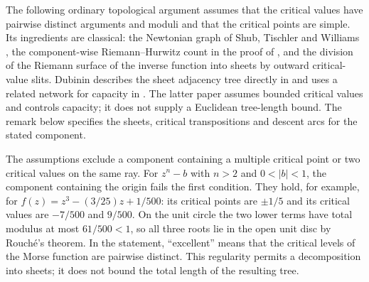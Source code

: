 \documentclass[11pt]{article}
\begin{document}
The following ordinary topological argument assumes that the critical
values have pairwise distinct arguments and moduli and that the critical
points are simple. Its ingredients are classical: the Newtonian graph of Shub, Tischler and Williams
\cite[\S2]{kozen-stefansson1997}, the component-wise Riemann--Hurwitz count in
the proof of \cite[Proposition~2.1]{eks2010}, and the division of the Riemann
surface of the inverse function into sheets by outward critical-value
slits.  Dubinin describes the sheet adjacency tree directly in
\cite[\S1, pp.~1169--1170]{dubinin2006critical} and uses a related
network for capacity in \cite[\S2, pp.~34--35]{dubinin2006capacity}.
The latter paper assumes bounded critical values and controls capacity;
it does not supply a Euclidean tree-length bound. The remark below
specifies the sheets, critical transpositions and descent arcs for the
stated component.

The assumptions exclude a component containing a multiple critical point
or two critical values on the same ray. For $z^n-b$ with $n>2$ and
$0<|b|<1$, the component containing the origin fails the first condition.
They hold, for example, for
$f(z)=z^3-(3/25)z+1/500$: its critical points are $\pm1/5$ and its
critical values are $-7/500$ and $9/500$. On the unit circle the two
lower terms have total modulus at most $61/500<1$, so all three roots
lie in the open unit disc by Rouch\'e's theorem. In the statement,
``excellent'' means that the critical levels of the Morse function are
pairwise distinct. This regularity permits a decomposition into sheets;
it does not bound the total length of the resulting tree.
\end{document}
